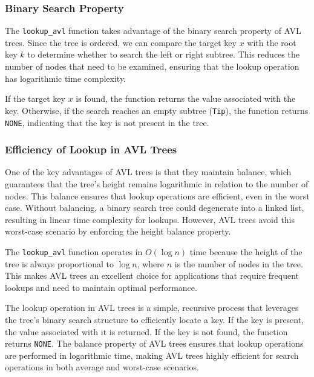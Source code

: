 \subsubsection{Binary Search Property}

The \texttt{lookup\_avl} function takes advantage of the binary search property of AVL trees. Since the tree is ordered, we can compare the target key \( x \) with the root key \( k \) to determine whether to search the left or right subtree. This reduces the number of nodes that need to be examined, ensuring that the lookup operation has logarithmic time complexity.

If the target key \( x \) is found, the function returns the value associated with the key. Otherwise, if the search reaches an empty subtree (\texttt{Tip}), the function returns \texttt{NONE}, indicating that the key is not present in the tree.

\subsubsection{Efficiency of Lookup in AVL Trees}

One of the key advantages of AVL trees is that they maintain balance, which guarantees that the tree's height remains logarithmic in relation to the number of nodes. This balance ensures that lookup operations are efficient, even in the worst case. Without balancing, a binary search tree could degenerate into a linked list, resulting in linear time complexity for lookups. However, AVL trees avoid this worst-case scenario by enforcing the height balance property.

The \texttt{lookup\_avl} function operates in \( O(\log n) \) time because the height of the tree is always proportional to \( \log n \), where \( n \) is the number of nodes in the tree. This makes AVL trees an excellent choice for applications that require frequent lookups and need to maintain optimal performance.

The lookup operation in AVL trees is a simple, recursive process that leverages the tree's binary search structure to efficiently locate a key. If the key is present, the value associated with it is returned. If the key is not found, the function returns \texttt{NONE}. The balance property of AVL trees ensures that lookup operations are performed in logarithmic time, making AVL trees highly efficient for search operations in both average and worst-case scenarios.
